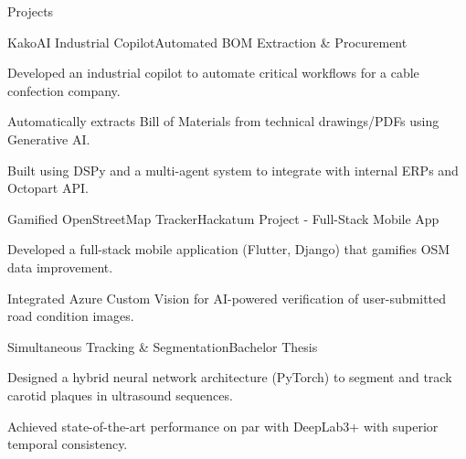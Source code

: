 \documentclass{resume} %
\begin{document}
\begin{rSection}{Projects}

\begin{rSubsection}{KakoAI Industrial Copilot}{}{Automated BOM Extraction \& Procurement}{}
\item Developed an industrial copilot to automate critical workflows for a cable confection company.
\item Automatically extracts Bill of Materials from technical drawings/PDFs using Generative AI.
\item Built using DSPy and a multi-agent system to integrate with internal ERPs and Octopart API.
\end{rSubsection}

\begin{rSubsection}{Gamified OpenStreetMap Tracker}{}{Hackatum Project - Full-Stack Mobile App}{}
\item Developed a full-stack mobile application (Flutter, Django) that gamifies OSM data improvement.
\item Integrated Azure Custom Vision for AI-powered verification of user-submitted road condition images.
\end{rSubsection}

\begin{rSubsection}{Simultaneous Tracking \& Segmentation}{}{Bachelor Thesis}{}
\item Designed a hybrid neural network architecture (PyTorch) to segment and track carotid plaques in ultrasound sequences.
\item Achieved state-of-the-art performance on par with DeepLab3+ with superior temporal consistency.
\end{rSubsection}

\end{rSection}
\end{document}
